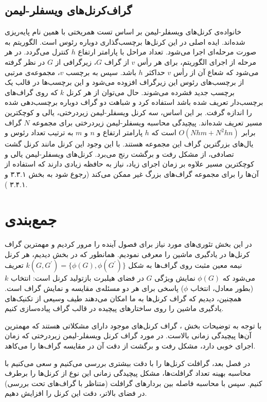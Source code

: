 \subsection{گراف‌کرنل‌های ویسفلر-لیمن}\label{sec:weisfeiler-lehman-kernels}
 خانواده‌ی کرنل‌های ویسفلر-لیمن بر اساس تست همریختی با همین نام پایه‌ریزی شده‌اند. ایده اصلی در این کرنل‌ها برچسب‌گذاری دوباره رئوس است. الگوریتم به صورت مرحله‌ای اجرا می‌شود. تعداد مراحل با پارامتر ارتفاع $h$ کنترل می‌گردد. در هر مرحله از اجرای الگوریتم، برای هر رأس $v$ از گراف $G$، زیرگرافی از $G$ در نظر گرفته می‌شود که شعاع آن از رأس $v$ حداکثر $h$ باشد. سپس به برچسب $v$، مجموعه‌ی مرتبی از برچسب‌های رئوس این زیرگراف افزوده می‌شود و این برچسب‌ها در قالب یک برچسب جدید فشرده می‌شوند. حال می‌توان از هر کرنل $k$ که روی گراف‌های برچسب‌دار تعریف شده باشد استفاده کرد و شباهت دو گراف دوباره برچسب‌دهی شده را اندازه گرفت. بر این اساس، سه کرنل ویسفلر-لیمن زیردرختی، یالی و کوچکترین مسیر تعریف شده‌اند. پیچیدگی محاسبه ویسفلر-لیمن زیردرختی برای مجموعه $N$ گراف برابر  $O(Nhm+N^2hn)$ است که $h$ پارامتر ارتفاع و $n$ و $m$ به ترتیب تعداد رئوس و یال‌های بزرگترین گراف این مجموعه هستند. با این وجود این کرنل مانند کرنل گشت تصادفی، از مشکل رفت و برگشت رنج می‌برد. کرنل‌های ویسفلر-لیمن یالی و کوچکترین مسیر علاوه بر زمان اجرای زیاد، نیاز به حافظه زیادی دارند که استفاده از آن‌ها را برای مجموعه گراف‌های بزرگ غیر ممکن می‌کند (رجوع شود به بخش ۳.۳.۱ و ۳.۴.۱ ).
 
\section{جمع‌بندی}
در این بخش تئوری‌های مورد نیاز برای فصول آینده را مرور کردیم و مهمترین گراف کرنل‌ها در یادگیری ماشین را معرفی نمودیم. همانطور که در بخش‌  دیدیم، هر کرنل نیمه معین مثبت روی گراف‌ها به شکل $k(G,G^\prime) = \lbrace{\phi(G),\phi(G^\prime)}\rbrace$ تعریف می‌شود که $\phi(G)$ نمایش ویژگی $G$ در فضای هیلبرت بازتولید کرنل است: انتخاب $k$ (بطور معادل، انتخاب $\phi$) پاسخی برای هر دو مسئله‌ی مقایسه و نمایش گراف است. همچنین، دیدیم که گراف کرنل‌ها به ما امکان می‌دهند طیف وسیعی از تکنیک‌های یادگیری ماشین را روی ساختارهای پیچیده در قالب گراف پیاده‌سازی کنیم.

با توجه به توضیحات بخش ، گراف کرنل‌های موجود دارای مشکلاتی هستند که مهمترین آن‌ها پیچیدگی زمانی بالاست. در مورد گراف کرنل ویسفلر-لیمن زیردرختی که زمان اجرای خوبی دارد، مشکل رفت و برگشت از دقت آن در مقایسه گراف‌ها را می‌کاهد.

در فصل بعد، گرافلت کرنل‌ها را با دقت بیشتری بررسی می‌کنیم و سعی می‌کنیم با محاسبه بهینه تعداد گرافلت‌ها، مشکل پیچیدگی زمانی این نوع از کرنل‌ها را برطرف کنیم. سپس با محاسبه فاصله بین بردارهای گرافلت (متناظر با گراف‌های تحت بررسی) در فضای بالاتر، دقت این کرنل را افزایش دهیم.
